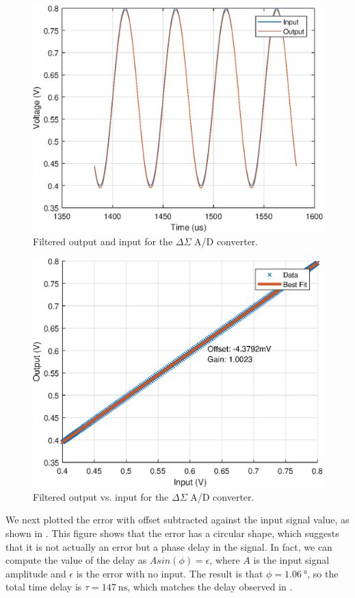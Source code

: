 \documentclass[journal,hidelinks]{IEEEtran}
\begin{document}
\begin{figure}[!htb]
  \centering
  \includegraphics[width=0.8\columnwidth]{circuit/filtered_output.eps}
  \caption{Filtered output and input for the $\Delta \Sigma$ A/D converter.}
  \label{fig:filtered_output}
\end{figure}

\begin{figure}[!htb]
  \centering
  \includegraphics[width=0.8\columnwidth]{circuit/gain_error_and_offset.eps}
  \caption{Filtered output vs. input for the $\Delta \Sigma$ A/D converter.}
  \label{fig:gain_error_and_offset}
\end{figure}

We next plotted the error with offset subtracted against the input signal value, as shown in . This figure shows that the error has a circular shape, which suggests that it is not actually an error but a phase delay in the signal. In fact, we can compute the value of the delay as $A sin(\phi) = \epsilon$, where $A$ is the input signal amplitude and $\epsilon$ is the error with no input. The result is that $\phi = \SI{1.06}{\degree}$, so the total time delay is $\tau = \SI{147}{\nano\second}$, which matches the delay observed in .
\end{document}
